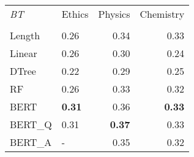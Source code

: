 \begin{tabular}{llrr}
\toprule
\textit{BT} & Ethics &  Physics &  Chemistry \\
  &        &          &            \\
\midrule
Length &   0.26 &     0.34 &       0.33 \\
Linear &   0.26 &     0.30 &       0.24 \\
DTree  &   0.22 &     0.29 &       0.25 \\
RF     &   0.26 &     0.33 &       0.32 \\
BERT   &   \textbf{0.31} &     0.36 &       \textbf{0.33} \\
BERT\_Q &   0.31 &     \textbf{0.37} &       0.33 \\
BERT\_A &      - &     0.35 &       0.32 \\
\bottomrule
\end{tabular}
